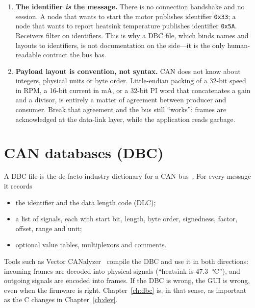 \begin{enumerate}[leftmargin=1.6em]
  \item \textbf{The identifier \emph{is} the message.} There is no
        connection handshake and no session. A node that wants to start the
        motor publishes identifier \texttt{0x33}; a node that wants to
        report heatsink temperature publishes identifier \texttt{0x5A}.
        Receivers filter on identifiers. This is why a DBC file, which
        binds names and layouts to identifiers, is not documentation on the
        side---it is the only human-readable contract the bus has.
  \item \textbf{Payload layout is convention, not syntax.} CAN does not
        know about integers, physical units or byte order. Little-endian
        packing of a 32-bit speed in RPM, a 16-bit current in
        \si{\milli\ampere}, or a 32-bit PI word that concatenates a gain
        and a divisor, is entirely a matter of agreement between producer
        and consumer. Break that agreement and the bus still ``works'':
        frames are acknowledged at the data-link layer, while the
        application reads garbage.
\end{enumerate}

\section{CAN databases (DBC)}
\label{sec:dbc-bg}

A DBC file is the de-facto industry dictionary for a CAN
bus~\cite{vectordbc}. For every message it records

\begin{itemize}[leftmargin=1.6em]
  \item the identifier and the data length code (DLC);
  \item a list of signals, each with start bit, length, byte order,
        signedness, factor, offset, range and unit;
  \item optional value tables, multiplexors and comments.
\end{itemize}

Tools such as Vector CANalyzer~\cite{vectorcanalyzer} compile the DBC and
use it in both directions: incoming frames are decoded into physical
signals (``heatsink is \SI{47.3}{\celsius}''), and outgoing signals are
encoded into frames. If the DBC is wrong, the GUI is wrong, even when the
firmware is right. Chapter~\ref{ch:dbc} is, in that sense, as important as
the C changes in Chapter~\ref{ch:dev}.

